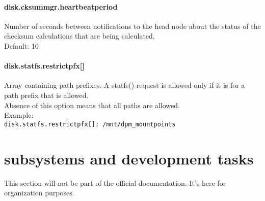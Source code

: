 \documentclass[a4paper,10pt]{scrreprt}
\begin{document}
\subsubsection{disk.cksummgr.heartbeatperiod}
Number of seconds between notifications to the head node about the status of the checksum calculations that are being calculated.\\
Default: 10\\

\subsubsection{disk.statfs.restrictpfx[]}
Array containing path prefixes. A statfs() request is allowed only if it is for a path prefix that is allowed.\\
Absence of this option means that all paths are allowed.\\


Example:\\
\lstinline"disk.statfs.restrictpfx[]: /mnt/dpm_mountpoints"\\

\chapter{subsystems and development tasks}
This section will not be part of the official documentation. It's here for organization purposes.\\
\end{document}
